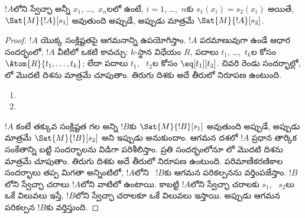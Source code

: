 \documentclass[../../../include/open-logic-section]{subfiles}
\begin{document}
\begin{prop}
$!A$లోని స్వేచ్ఛా  అన్నీ $x_1$, \dots,~$x_n$లలో ఉంటే,
$i = 1$, \dots,~$n$కు $s_1(x_i) = s_2(x_i)$ అయితే,
$\Sat{M}{!A}[s_1]$ అవుతుంది అప్పుడే, అప్పుడు మాత్రమే
$\Sat{M}{!A}[s_2]$.
\end{prop}

\begin{proof}
$!A$ యొక్క సంక్లిష్టతపై ఆగమనాన్ని ఉపయోగిస్తాం. $!A$ పరమాణువుగా ఉండే
ఆధార సందర్భంలో, $!A$ వీటిలో ఒకటి కావచ్చు:
$k$-స్థాన విధేయం $R$, పదాలు $t_1$, \dots,~$t_k$ల కోసం
$\Atom{R}{t_1, \dots, t_k}$; లేదా పదాలు $t_1$, ~$t_2$ల కోసం
$\eq[t_1][t_2]$. చివరి రెండు సందర్భాల్లో, లో
మొదటి దిశను మాత్రమే చూపుతాం. తిరుగు దిశకు అదే తీరులో నిరూపణ ఉంటుంది.

\begin{enumerate}


\item
\item
\end{enumerate}

$!A$ కంటే తక్కువ సంక్లిష్టత గల అన్ని  $!B$కు
$\Sat{M}{!B}[s_1]$ అవుతుంది అప్పుడే, అప్పుడు మాత్రమే
$\Sat{M}{!B}[s_2]$ అని ఇప్పుడు అనుకుందాం. ఆగమన దశలో $!A$ ప్రధాన తార్కిక సంకేతాన్ని బట్టి సందర్భాలను విడిగా పరిశీలిస్తాం. ప్రతి సందర్భంలోనూ
లో మొదటి దిశను మాత్రమే చూపుతాం. తిరుగు దిశకు అదే తీరులో నిరూపణ ఉంటుంది. పరిమాణీకరణికాల సందర్భాలు తప్ప మిగతా అన్నింటిలో,
$!A$లోని ~$!B$కు ఆగమన పరికల్పనను వర్తింపజేస్తాం.
$!B$లోని స్వేచ్ఛా చరాలు $!A$లోని వాటిలో ఉంటాయి. కాబట్టి $!A$లోని
స్వేచ్ఛా చరాలకు $s_1$, ~$s_2$లు ఒకే విలువలు ఇస్తే, $!B$లోని స్వేచ్ఛా చరాలకూ
ఒకే విలువలు ఇస్తాయి. అప్పుడు ఆగమన పరికల్పన $!B$కు వర్తిస్తుంది.


\end{proof}
\end{document}
